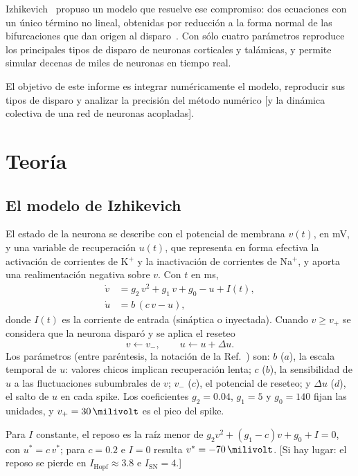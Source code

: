 \documentclass[10pt,a4paper,twocolumn]{article}
\begin{document}
Izhikevich~\cite{izhikevich2003} propuso un modelo que resuelve ese
compromiso: dos ecuaciones con un único término no lineal, obtenidas por
reducción a la forma normal de las bifurcaciones que dan origen al
disparo~\cite{izhikevich2007}. Con sólo cuatro parámetros reproduce los
principales tipos de disparo de neuronas corticales y talámicas, y permite
simular decenas de miles de neuronas en tiempo real.

El objetivo de este informe es integrar numéricamente el modelo, reproducir
sus tipos de disparo y analizar la precisión del método numérico
[y la dinámica colectiva de una red de neuronas acopladas]. %

\section{Teoría}
\subsection{El modelo de Izhikevich}
El estado de la neurona se describe con el potencial de membrana $v(t)$, en mV,
y una variable de recuperación $u(t)$, que representa en forma efectiva la
activación de corrientes de K$^+$ y la inactivación de corrientes de Na$^+$, y
aporta una realimentación negativa sobre $v$. Con $t$ en ms,
\begin{align}
  \dot v &= g_2\,v^2 + g_1\,v + g_0 - u + I(t), \label{eq:v}\\
  \dot u &= b\,(c\,v - u), \label{eq:u}
\end{align}
donde $I(t)$ es la corriente de entrada (sináptica o inyectada). Cuando
$v\geq v_+$ se considera que la neurona disparó y se aplica el reseteo
\begin{equation}
  v \leftarrow v_-, \qquad u \leftarrow u + \Delta u .
  \label{eq:reset}
\end{equation}
Los parámetros (entre paréntesis, la notación de la Ref.~\cite{izhikevich2003}) son:
$b$ ($a$), la escala temporal de $u$: valores chicos implican recuperación lenta;
$c$ ($b$), la sensibilidad de $u$ a las fluctuaciones subumbrales de $v$;
$v_-$ ($c$), el potencial de reseteo; y $\Delta u$ ($d$), el salto de $u$ en cada
spike. Los coeficientes $g_2=\num{0.04}$, $g_1=5$ y $g_0=140$ fijan las unidades,
y $v_+=\SI{30}{\milivolt}$ es el pico del spike.

Para $I$ constante, el reposo es la raíz menor de
$g_2v^2+(g_1-c)v+g_0+I=0$, con $u^*=c\,v^*$; para $c=\num{0.2}$ e $I=0$ resulta
$v^*=\SI{-70}{\milivolt}$. [Si hay lugar: el reposo se pierde en
$I_\mathrm{Hopf}\approx\num{3.8}$ e $I_\mathrm{SN}=4$.] %
\end{document}
